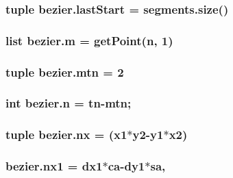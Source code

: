 \subsubsection[{last\+Start}]{\setlength{\rightskip}{0pt plus 5cm}tuple bezier.\+last\+Start = segments.\+size()}\label{namespacebezier_ad3e176f900e0e892b1621ab09241ca08}
\hypertarget{namespacebezier_a7a011a9ac17e30960f8474441f256e6c}{}
\subsubsection[{m}]{\setlength{\rightskip}{0pt plus 5cm}list bezier.\+m = get\+Point({\bf n}, 1)}\label{namespacebezier_a7a011a9ac17e30960f8474441f256e6c}
\hypertarget{namespacebezier_a8f2a3ea08791f163da137639e5cac244}{}
\subsubsection[{mtn}]{\setlength{\rightskip}{0pt plus 5cm}tuple bezier.\+mtn = 2}\label{namespacebezier_a8f2a3ea08791f163da137639e5cac244}
\hypertarget{namespacebezier_a6af7fcd36e64d55245071a38cffbae33}{}
\subsubsection[{n}]{\setlength{\rightskip}{0pt plus 5cm}int bezier.\+n = {\bf tn}-\/{\bf mtn};}\label{namespacebezier_a6af7fcd36e64d55245071a38cffbae33}
\hypertarget{namespacebezier_a5c7571dbff24fb6f29715b41642f9c19}{}
\subsubsection[{nx}]{\setlength{\rightskip}{0pt plus 5cm}tuple bezier.\+nx = (x1$\ast$y2-\/y1$\ast${\bf x2})}\label{namespacebezier_a5c7571dbff24fb6f29715b41642f9c19}
\hypertarget{namespacebezier_a78534ab25df67271c40d717cb26aac0b}{}
\subsubsection[{nx1}]{\setlength{\rightskip}{0pt plus 5cm}bezier.\+nx1 = dx1$\ast$ca-\/{\bf dy1}$\ast$sa,}\label{namespacebezier_a78534ab25df67271c40d717cb26aac0b}
\hypertarget{namespacebezier_ac63543ece85dc0cb795314fa0ad3f11c}{}
